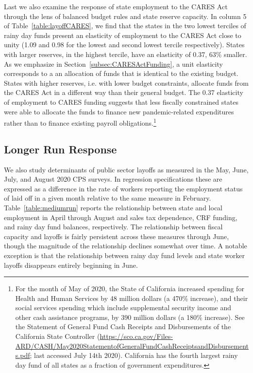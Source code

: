 Last we also examine the response of state employment to the CARES Act through the lens of balanced budget rules and state reserve capacity. In column 5 of Table~\ref{table:layoffCARES}, we find that the states in the two lowest terciles of rainy day funds present an elasticity of employment to the CARES Act close to unity (1.09 and 0.98 for the lowest and second lowest tercile respectively). States with larger reserves, in the highest tercile, have an elasticity of 0.37, 63\% smaller. As we emphasize in Section~\ref{subsec:CARESActFunding}, a unit elasticity corresponds to a an allocation of funds that is identical to the existing budget. States with higher reserves, i.e. with lower budget constraints, allocate funds from the CARES Act in a different way than their general budget. The 0.37 elasticity of employment to CARES funding suggests that less fiscally constrained states were able to allocate the funds to finance new pandemic-related expenditures rather than to finance existing payroll obligations.\footnote{For the month of May of 2020, the State of California increased spending for Health and Human Services by 48 million dollars (a 470\% increase), and their social services spending which include supplemental security income and other cash assistance programs, by 390 million dollars (a 180\% increase). See the Statement of General Fund Cash Receipts and Disbursements of the California State Controller (\url{https://sco.ca.gov/Files-ARD/CASH/May2020StatementofGeneralFundCashReceiptsandDisbursements.pdf}; last accessed July 14th 2020). California has the fourth largest rainy day fund of all states as a fraction of government expenditures.}

\subsection{Longer Run Response}

We also study determinants of public sector layoffs as measured in the May, June, July, and August 2020 CPS surveys. In regression specifications these are expressed as a difference in the rate of workers reporting the employment status of laid off in a given month relative to the same measure in February. Table~\ref{table:mediumrun} reports the relationship between state and local employment in April through August and sales tax dependence, CRF funding, and rainy day fund balances, respectively. The relationship between fiscal capacity and layoffs is fairly persistent across these measures through June, though the magnitude of the relationship declines somewhat over time. A notable exception is that the relationship between rainy day fund levels and state worker layoffs disappears entirely beginning in June. 


